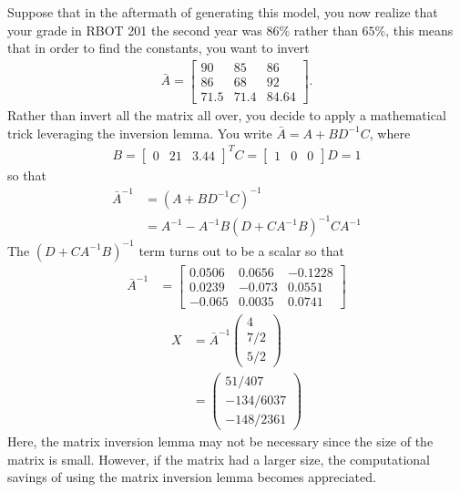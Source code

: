\begin{example}
	Suppose that in the aftermath of generating this model, you now realize that your grade in RBOT 201  the second year was $86\%$ rather than $65\%$, this means that in order to find the constants, you want to invert
	\begin{align}
	\bar{A} = \begin{bmatrix}
	90 & 85 & 86 \\
	86 & 68 & 92 \\
	71.5 & 71.4 & 84.64
	\end{bmatrix}.
	\end{align}
	Rather than invert all the matrix all over, you decide to apply a mathematical trick leveraging the inversion lemma. You write $\bar{A} = A + BD^{-1}C$, where 
	\begin{subequations}
		\begin{align}
			B = \begin{bmatrix}
					0 & 21 & 3.44
			\end{bmatrix}^T
			C = \begin{bmatrix}
			1 & 0 & 0
			\end{bmatrix}
			D = 1
		\end{align}
	\end{subequations}
so that 
%
\begin{align}
	\bar{A}^{-1} &= \left(A + BD^{-1}C\right)^{-1} \\
						&= A^{-1} - A^{-1} B\left(D + C A^{-1}B\right)^{-1} C A^{-1}
\end{align}
%
The $\left(D + C A^{-1}B\right)^{-1}$ term turns out to be a scalar so that 
%
\begin{align}
\bar{A}^{-1} &= \begin{bmatrix}
0.0506 & 0.0656 & -0.1228 \\
%
0.0239 & -0.073 & 0.0551 \\
%
-0.065 & 0.0035 & 0.0741
\end{bmatrix}
\end{align}
%
\begin{align}
	X &= \bar{A}^{-1} \left(\begin{array}{c}
	4 \\ 7/2 \\ 5/2
	\end{array}\right) \nonumber \\
	&= 
	\left(\begin{array}{c}
	51/407   \\
	-134/6037  \\
	-148/2361 
	\end{array}\right)
\end{align}
%
Here, the matrix inversion lemma may not be necessary since the size of the matrix is small. However, if the matrix had a larger size, the computational savings of using the matrix inversion lemma becomes appreciated.

\end{example}

